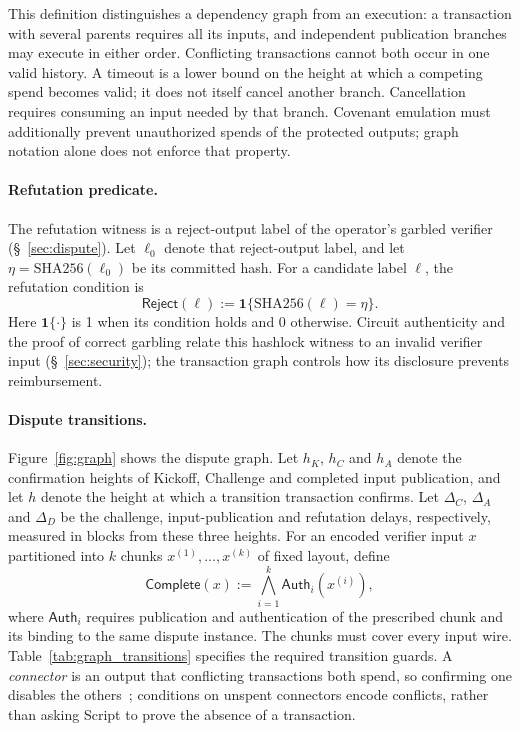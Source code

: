\documentclass[11pt]{article}
\begin{document}
This definition distinguishes a dependency graph from an execution: a
transaction with several parents requires all its inputs, and independent
publication branches may execute in either order. Conflicting transactions
cannot both occur in one valid history. A timeout is a lower bound on the
height at which a competing spend becomes valid; it does not itself cancel
another branch. Cancellation requires consuming an input needed by that
branch. Covenant emulation must additionally prevent unauthorized spends
of the protected outputs; graph notation alone does not enforce that
property.

\paragraph{Refutation predicate.} The refutation witness is a reject-output
label of the operator's garbled verifier (\S~\ref{sec:dispute}). Let $\ell_0$ denote that reject-output
label, and let $\eta=\mathrm{SHA256}(\ell_0)$ be its
committed hash. For a candidate label $\ell$, the refutation condition is
\[
  \mathsf{Reject}(\ell)
  :=\mathbf{1}\{\mathrm{SHA256}(\ell)=\eta\}.
\]
Here $\mathbf{1}\{\cdot\}$ is 1 when its condition holds and 0 otherwise.
Circuit authenticity and the proof of correct garbling relate this hashlock witness to an
invalid verifier input (\S~\ref{sec:security}); the transaction graph
controls how its disclosure prevents reimbursement.

\paragraph{Dispute transitions.} Figure~\ref{fig:graph} shows the dispute
graph. Let $h_K$, $h_C$ and $h_A$ denote
the confirmation heights of Kickoff, Challenge and completed input
publication, and let $h$ denote the height at which a transition transaction
confirms. Let $\Delta_C$, $\Delta_A$ and $\Delta_D$ be the challenge,
input-publication and refutation delays, respectively, measured in blocks
from these three heights. For an encoded verifier input $x$ partitioned
into $k$ chunks $x^{(1)},\ldots,x^{(k)}$ of fixed layout, define
\[
  \mathsf{Complete}(x)
  :=\bigwedge_{i=1}^{k}\mathsf{Auth}_i(x^{(i)}),
\]
where $\mathsf{Auth}_i$ requires publication and authentication of the
prescribed chunk and its binding to the same dispute instance. The chunks
must cover every input wire. Table~\ref{tab:graph_transitions} specifies the
required transition guards. A \emph{connector} is an output that conflicting transactions both spend, so confirming one disables the others~\cite{laa25bitvm2}; conditions on unspent connectors encode conflicts, rather than asking Script to prove the absence of a transaction.
\end{document}
